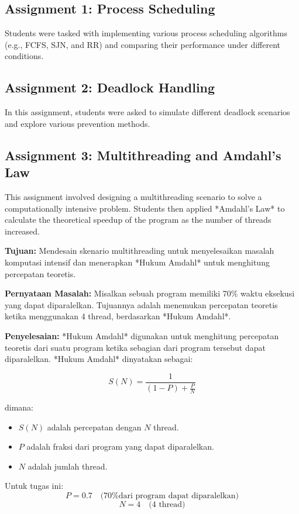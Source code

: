 \documentclass[12pt]{article}
\begin{document}
\subsection{Assignment 1: Process Scheduling}
Students were tasked with implementing various process scheduling algorithms (e.g., FCFS, SJN, and RR) and comparing their performance under different conditions.

\subsection{Assignment 2: Deadlock Handling}
In this assignment, students were asked to simulate different deadlock scenarios and explore various prevention methods.

\subsection{Assignment 3: Multithreading and Amdahl's Law}
This assignment involved designing a multithreading scenario to solve a computationally intensive problem. Students then applied *Amdahl's Law* to calculate the theoretical speedup of the program as the number of threads increased.

\textbf{Tujuan:}  
Mendesain skenario multithreading untuk menyelesaikan masalah komputasi intensif dan menerapkan *Hukum Amdahl* untuk menghitung percepatan teoretis.

\textbf{Pernyataan Masalah:}  
Misalkan sebuah program memiliki 70\% waktu eksekusi yang dapat diparalelkan. Tujuannya adalah menemukan percepatan teoretis ketika menggunakan 4 thread, berdasarkan *Hukum Amdahl*.

\textbf{Penyelesaian:}  
*Hukum Amdahl* digunakan untuk menghitung percepatan teoretis dari suatu program ketika sebagian dari program tersebut dapat diparalelkan. *Hukum Amdahl* dinyatakan sebagai:

\[
S(N) = \frac{1}{(1 - P) + \frac{P}{N}}
\]

dimana:
\begin{itemize}
    \item \( S(N) \) adalah percepatan dengan \( N \) thread.
    \item \( P \) adalah fraksi dari program yang dapat diparalelkan.
    \item \( N \) adalah jumlah thread.
\end{itemize}

Untuk tugas ini:
\[
P = 0.7 \quad \text{(70\% dari program dapat diparalelkan)}
\]
\[
N = 4 \quad \text{(4 thread)}
\]
\end{document}
